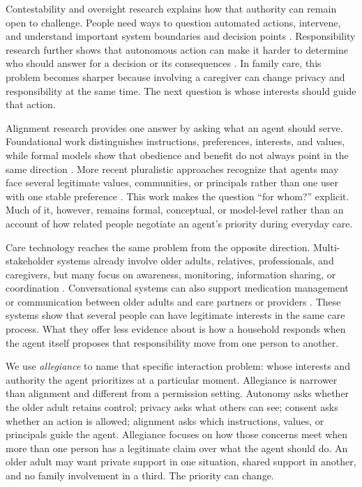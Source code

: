 Contestability and oversight research explains how that authority can remain open to challenge. People need ways to question automated actions, intervene, and understand important system boundaries and decision points \cite{6,7,25,28}. Responsibility research further shows that autonomous action can make it harder to determine who should answer for a decision or its consequences \cite{99}. In family care, this problem becomes sharper because involving a caregiver can change privacy and responsibility at the same time. The next question is whose interests should guide that action.

Alignment research provides one answer by asking what an agent should serve. Foundational work distinguishes instructions, preferences, interests, and values, while formal models show that obedience and benefit do not always point in the same direction \cite{32,38,39,79}. More recent pluralistic approaches recognize that agents may face several legitimate values, communities, or principals rather than one user with one stable preference \cite{29,62,105,121}. This work makes the question ``for whom?'' explicit. Much of it, however, remains formal, conceptual, or model-level rather than an account of how related people negotiate an agent's priority during everyday care.

Care technology reaches the same problem from the opposite direction. Multi-stakeholder systems already involve older adults, relatives, professionals, and caregivers, but many focus on awareness, monitoring, information sharing, or coordination \cite{22,24,63,81,82,94,111,115,118}. Conversational systems can also support medication management or communication between older adults and care partners or providers \cite{74,117}. These systems show that several people can have legitimate interests in the same care process. What they offer less evidence about is how a household responds when the agent itself proposes that responsibility move from one person to another.

We use \emph{allegiance} to name that specific interaction problem: whose interests and authority the agent prioritizes at a particular moment. Allegiance is narrower than alignment and different from a permission setting. Autonomy asks whether the older adult retains control; privacy asks what others can see; consent asks whether an action is allowed; alignment asks which instructions, values, or principals guide the agent. Allegiance focuses on how those concerns meet when more than one person has a legitimate claim over what the agent should do. An older adult may want private support in one situation, shared support in another, and no family involvement in a third. The priority can change.


